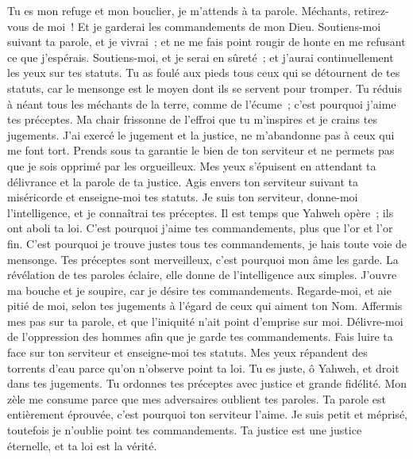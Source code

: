 \begin{multicols}{2}
Tu es mon refuge et mon bouclier, je m'attends à ta parole.
Méchants, retirez-vous de moi~! Et je garderai les commandements de mon Dieu.
Soutiens-moi suivant ta parole, et je vivrai~; et ne me fais point rougir de honte en me refusant ce que j'espérais.
Soutiens-moi, et je serai en sûreté~; et j'aurai continuellement les yeux sur tes statuts.
Tu as foulé aux pieds tous ceux qui se détournent de tes statuts, car le mensonge est le moyen dont ils se servent pour tromper.
Tu réduis à néant tous les méchants de la terre, comme de l'écume~; c'est pourquoi j'aime tes préceptes.
Ma chair frissonne de l'effroi que tu m'inspires et je crains tes jugements.
 J'ai exercé le jugement et la justice, ne m'abandonne pas à ceux qui me font tort.
Prends sous ta garantie le bien de ton serviteur et ne permets pas que je sois opprimé par les orgueilleux.
Mes yeux s'épuisent en attendant ta délivrance et la parole de ta justice.
Agis envers ton serviteur suivant ta miséricorde et enseigne-moi tes statuts.
Je suis ton serviteur, donne-moi l'intelligence, et je connaîtrai tes préceptes.
Il est temps que Yahweh opère~; ils ont aboli ta loi.
C'est pourquoi j'aime tes commandements, plus que l'or et l'or fin.
C'est pourquoi je trouve justes tous tes commandements, je hais toute voie de mensonge.
 Tes préceptes sont merveilleux, c'est pourquoi mon âme les garde.
La révélation de tes paroles éclaire, elle donne de l'intelligence aux simples.
J'ouvre ma bouche et je soupire, car je désire tes commandements.
Regarde-moi, et aie pitié de moi, selon tes jugements à l'égard de ceux qui aiment ton Nom.
Affermis mes pas sur ta parole, et que l'iniquité n'ait point d'emprise sur moi.
Délivre-moi de l'oppression des hommes afin que je garde tes commandements.
Fais luire ta face sur ton serviteur et enseigne-moi tes statuts.
Mes yeux répandent des torrents d'eau parce qu'on n'observe point ta loi.
 Tu es juste, ô Yahweh, et droit dans tes jugements.
Tu ordonnes tes préceptes avec justice et grande fidélité.
Mon zèle me consume parce que mes adversaires oublient tes paroles.
Ta parole est entièrement éprouvée, c'est pourquoi ton serviteur l'aime.
Je suis petit et méprisé, toutefois je n'oublie point tes commandements.
Ta justice est une justice éternelle, et ta loi est la vérité.

\end{multicols}
